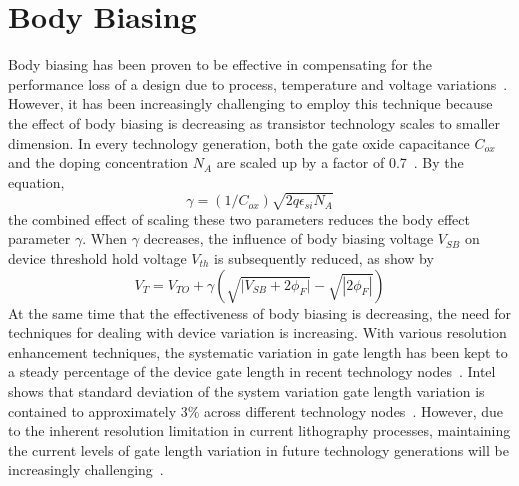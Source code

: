 \section{Body Biasing}
\label{sec:bodybiasing}

Body biasing has been proven to be effective in compensating for the performance loss of a design due to process, temperature and voltage variations~\cite{Body Biasing}.
However, it has been increasingly challenging to employ this technique because the effect of body biasing is decreasing as transistor technology scales to smaller dimension.
In every technology generation, both the gate oxide capacitance $C_{ox}$ and the doping concentration $N_A$ are scaled up by a factor of 0.7~\cite{Denard}.
By the equation,
\begin{equation}
\gamma = (1/C_{ox})\sqrt{2q\epsilon_{si}N_A}
\end{equation}
the combined effect of scaling these two parameters reduces the body effect parameter $\gamma$. When $\gamma$ decreases, the influence of body biasing voltage $V_{SB}$ on device threshold hold voltage $V_{th}$ is subsequently reduced, as show by
\begin{equation}
V_{T} = V_{TO} + \gamma ( \sqrt{ | {V_{SB} + 2\phi_{F} | } } - \sqrt{ | 2\phi_{F} | } )
\end{equation}
At the same time that the effectiveness of body biasing is decreasing, the need for techniques for dealing with device variation is increasing.
With various resolution enhancement techniques, the systematic variation in gate length has been kept to a steady percentage of the device gate length in recent technology nodes~\cite{Intel:2009}.
Intel shows that standard deviation of the system variation gate length variation is contained to approximately 3\% across different technology nodes~\cite{Intel:2009}.
However, due to the inherent resolution limitation in current lithography processes, maintaining the current levels of gate length variation in future technology generations will be increasingly challenging~\cite{OPC20}.
   
